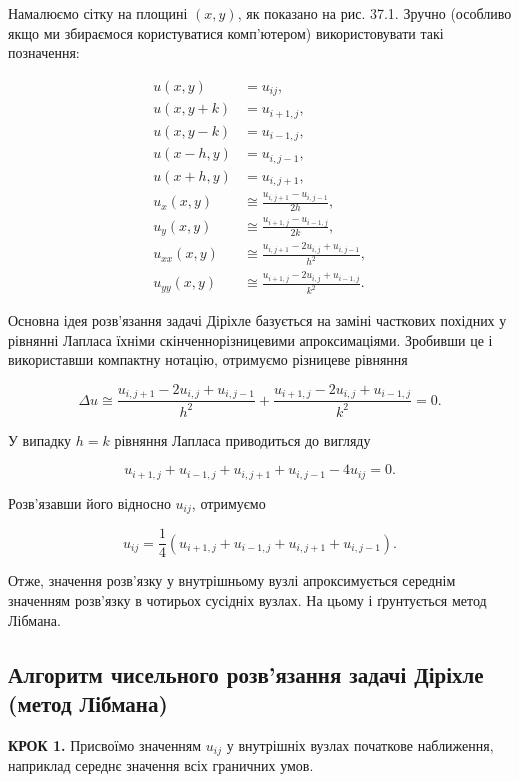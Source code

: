 \documentclass[
  ukrainian,
]{article}
\begin{document}
Намалюємо сітку на площині \((x,y)\), як показано на рис. 37.1. Зручно
(особливо якщо ми збираємося користуватися комп'ютером) використовувати
такі позначення:

\[\begin{aligned}u(x,y)&=u_{ij},\\u(x,y+k)&=u_{i+1,j},\\u(x,y-k)&=u_{i-1,j},\\u(x-h,y)&=u_{i,j-1},\\u(x+h,y)&=u_{i,j+1},\\u_x(x,y)&\cong \frac{u_{i,j+1}-u_{i,j-1}}{2h},\\u_y(x,y)&\cong \frac{u_{i+1,j}-u_{i-1,j}}{2k},\\u_{xx}(x,y)&\cong \frac{u_{i,j+1}-2u_{i,j}+u_{i,j-1}}{h^2},\\u_{yy}(x,y)&\cong \frac{u_{i+1,j}-2u_{i,j}+u_{i-1,j}}{k^2}.\end{aligned}\]

Основна ідея розв'язання задачі Діріхле базується на заміні часткових
похідних у рівнянні Лапласа їхніми скінченнорізницевими апроксимаціями.
Зробивши це і використавши компактну нотацію, отримуємо різницеве
рівняння

\[\Delta u \cong\frac{u_{i,j+1}-2u_{i,j}+u_{i,j-1}}{h^2}+\frac{u_{i+1,j}-2u_{i,j}+u_{i-1,j}}{k^2}=0.\]

У випадку \(h=k\) рівняння Лапласа приводиться до вигляду

\[u_{i+1,j}+u_{i-1,j}+u_{i,j+1}+u_{i,j-1}-4u_{ij}=0.\]

Розв'язавши його відносно \(u_{ij}\), отримуємо

\[u_{ij}=\frac{1}{4}\left(u_{i+1,j}+u_{i-1,j}+u_{i,j+1}+u_{i,j-1}\right).\]

Отже, значення розв'язку у внутрішньому вузлі апроксимується середнім
значенням розв'язку в чотирьох сусідніх вузлах. На цьому і ґрунтується
метод Лібмана.

\subsection{Алгоритм чисельного розв'язання задачі Діріхле (метод
Лібмана)}\label{ux430ux43bux433ux43eux440ux438ux442ux43c-ux447ux438ux441ux435ux43bux44cux43dux43eux433ux43e-ux440ux43eux437ux432ux44fux437ux430ux43dux43dux44f-ux437ux430ux434ux430ux447ux456-ux434ux456ux440ux456ux445ux43bux435-ux43cux435ux442ux43eux434-ux43bux456ux431ux43cux430ux43dux430}

\textbf{КРОК 1.} Присвоїмо значенням \(u_{ij}\) у внутрішніх вузлах
початкове наближення, наприклад середнє значення всіх граничних умов.
\end{document}
